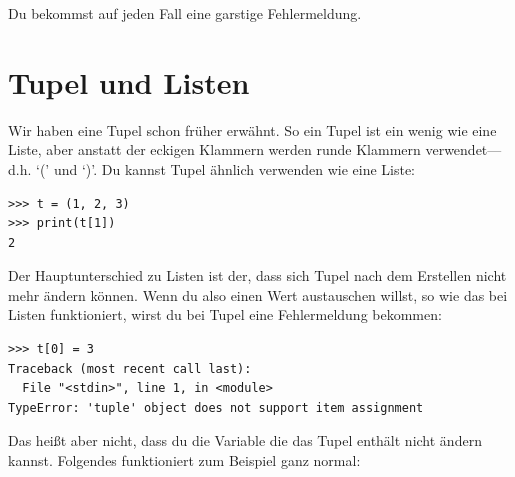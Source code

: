 \noindent
Du bekommst auf jeden Fall eine garstige Fehlermeldung.

\section{Tupel und Listen}\label{tuplesandlists}

Wir haben eine Tupel schon früher erwähnt. So ein Tupel ist ein wenig wie eine Liste, aber anstatt der eckigen Klammern werden runde Klammern verwendet---d.h. `(' und `)'. Du kannst Tupel ähnlich verwenden wie eine Liste:

\begin{Verbatim}[frame=single]
>>> t = (1, 2, 3)
>>> print(t[1])
2
\end{Verbatim}

Der Hauptunterschied zu Listen ist der, dass sich Tupel nach dem Erstellen nicht mehr ändern können. Wenn du also einen Wert austauschen willst, so wie das bei Listen funktioniert, wirst du bei Tupel eine Fehlermeldung bekommen:

\begin{Verbatim}[frame=single]
>>> t[0] = 3
Traceback (most recent call last):
  File "<stdin>", line 1, in <module>
TypeError: 'tuple' object does not support item assignment
\end{Verbatim}

Das heißt aber nicht, dass du die Variable die das Tupel enthält nicht ändern kannst. Folgendes funktioniert zum Beispiel ganz normal:

